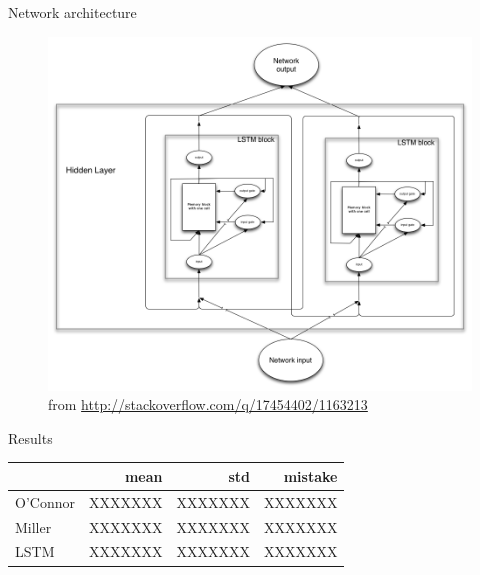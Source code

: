 \documentclass{beamer}
\newcommand{\ra}[1]{\renewcommand{\arraystretch}{#1}}
\begin{document}
\begin{frame}{Network architecture}
    \begin{figure}[H]
        \begin{center}
        \includegraphics[height=.7\textheight]{figures/lstm2.png} \\
        \tiny from \url{http://stackoverflow.com/q/17454402/1163213}
        \end{center}
    \end{figure}
\end{frame}

\begin{frame}{Results}
    \begin{table}[H]
        \begin{center}
        \ra{1.2}
        \begin{tabular}{@{} lrrr @{}}
        \toprule
        {} & mean & std & mistake \\
        \midrule
        O'Connor  &     XXXXXXX &    XXXXXXX &    XXXXXXX \\
        Miller    &     XXXXXXX &    XXXXXXX &    XXXXXXX \\
        LSTM      &     XXXXXXX &    XXXXXXX &    XXXXXXX \\
        \bottomrule
        \end{tabular}
        \end{center}
    \end{table}
\end{frame}
\end{document}
